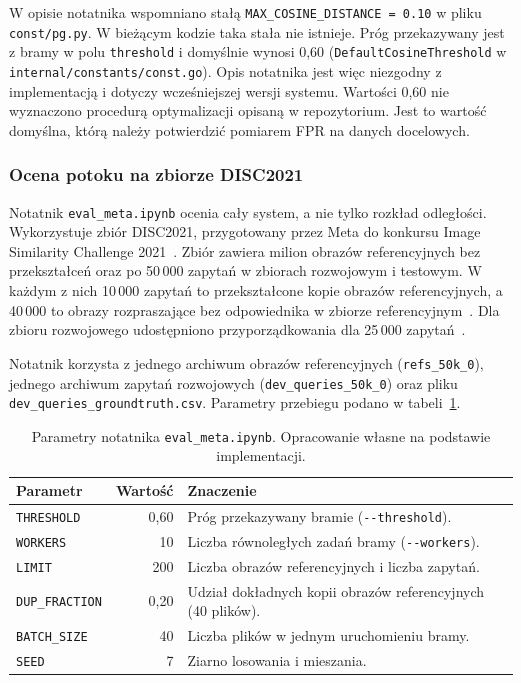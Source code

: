 W opisie notatnika wspomniano stałą \texttt{MAX\_COSINE\_DISTANCE = 0.10}
w pliku \texttt{const/pg.py}. W bieżącym kodzie taka stała nie
istnieje. Próg przekazywany jest z bramy w polu \texttt{threshold}
i domyślnie wynosi 0,60 (\texttt{DefaultCosineThreshold}
w \texttt{internal/constants/const.go}). Opis notatnika jest więc
niezgodny z implementacją i dotyczy wcześniejszej wersji systemu.
Wartości 0,60 nie wyznaczono procedurą optymalizacji opisaną
w repozytorium. Jest to wartość domyślna, którą należy potwierdzić
pomiarem FPR na danych docelowych.

\subsubsection{Ocena potoku na zbiorze DISC2021}

Notatnik \texttt{eval\_meta.ipynb} ocenia cały system, a nie tylko
rozkład odległości. Wykorzystuje zbiór DISC2021, przygotowany przez
Meta do konkursu Image Similarity Challenge 2021~\cite{douze2021disc,
papakipos2022isc}. Zbiór zawiera milion obrazów referencyjnych bez
przekształceń oraz po 50\,000 zapytań w zbiorach rozwojowym
i testowym. W każdym z nich 10\,000 zapytań to przekształcone kopie
obrazów referencyjnych, a 40\,000 to obrazy rozpraszające bez
odpowiednika w zbiorze referencyjnym~\cite{douze2021disc}. Dla zbioru
rozwojowego udostępniono przyporządkowania dla 25\,000
zapytań~\cite{douze2021disc}.

Notatnik korzysta z jednego archiwum obrazów referencyjnych
(\texttt{refs\_50k\_0}), jednego archiwum zapytań rozwojowych
(\texttt{dev\_queries\_50k\_0}) oraz pliku
\texttt{dev\_queries\_groundtruth.csv}. Parametry przebiegu podano
w tabeli~\ref{tab:eval-meta-params}.

\begin{table}[!htbp]
\centering
\caption{Parametry notatnika \texttt{eval\_meta.ipynb}.
Opracowanie własne na podstawie implementacji.}
\label{tab:eval-meta-params}
\begin{tabular}{|l|r|p{}|}
\hline
\textbf{Parametr} & \textbf{Wartość} & \textbf{Znaczenie} \\
\hline
\texttt{THRESHOLD} & 0,60 & Próg przekazywany bramie
(\texttt{-{}-threshold}). \\
\hline
\texttt{WORKERS} & 10 & Liczba równoległych zadań bramy
(\texttt{-{}-workers}). \\
\hline
\texttt{LIMIT} & 200 & Liczba obrazów referencyjnych i liczba zapytań. \\
\hline
\texttt{DUP\_FRACTION} & 0,20 & Udział dokładnych kopii obrazów
referencyjnych (40 plików). \\
\hline
\texttt{BATCH\_SIZE} & 40 & Liczba plików w jednym uruchomieniu bramy. \\
\hline
\texttt{SEED} & 7 & Ziarno losowania i mieszania. \\
\hline
\end{tabular}
\end{table}

